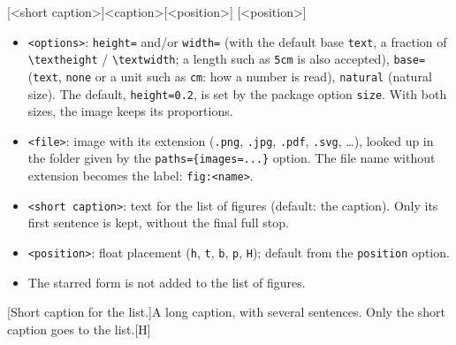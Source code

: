 \documentclass[sectioning=nobreak]{myreport}
\begin{document}

\begin{demosyntax}
[<short caption>]{<caption>}[<position>]
[<position>]
\end{demosyntax}
\begin{itemize}
  \item \texttt{<options>}: \texttt{height=} and/or \texttt{width=} (with
    the default base \texttt{text}, a fraction of \verb|\textheight| /
    \verb|\textwidth|; a length such as \texttt{5cm} is also accepted),
    \texttt{base=} (\texttt{text}, \texttt{none} or a unit such as
    \texttt{cm}: how a number is read), \texttt{natural} (natural size).
    The default, \texttt{height=0.2}, is set by the package option
    \texttt{size}. With both sizes, the image keeps its proportions.
  \item \texttt{<file>}: image with its extension (\texttt{.png},
    \texttt{.jpg}, \texttt{.pdf}, \texttt{.svg}, \dots), looked up in the
    folder given by the \texttt{paths=\{images=...\}} option. The file name
    without extension becomes the label: \texttt{fig:<name>}.
  \item \texttt{<short caption>}: text for the list of figures (default: the
    caption). Only its first sentence is kept, without the final full stop.
  \item \texttt{<position>}: float placement (\texttt{h}, \texttt{t},
    \texttt{b}, \texttt{p}, \texttt{H}); default from the
    \texttt{position} option.
  \item The starred form is not added to the list of figures.
\end{itemize}

\mylistoffigures*


\begin{demo}
\end{demo}

\begin{demo}
[Short caption for the list.]{A long caption,
with several sentences. Only the short caption goes to the list.}[H]
\end{demo}
\end{document}
